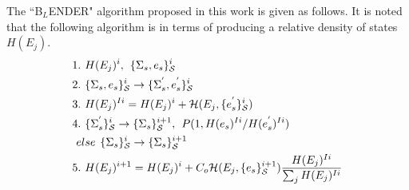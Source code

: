 \documentclass[twocolumn]{article}
\begin{document}
The ``B$_{L}$ENDER" algorithm proposed in this work  is given as follows. It is noted that the following algorithm is in terms of producing a relative density of states $H(E_j)$.  \\
\begin{equation}
\begin{split}
&1.\hspace{0.125cm} H(E_j)^i ,\hspace{0.15cm}  \{\Sigma_{s},e_s\}_{\mathcal{S}}^i\\
&2. \hspace{0.125cm}\{\Sigma_{s},e_s\}_{\mathcal{S}}^i \rightarrow  \{\Sigma_{s}^{'},e_s^{'}\}_{\mathcal{S}}^i\\
&3. \hspace{0.125cm}H(E_j)^{Ii} = H(E_j)^i + \mathcal{H}(E_j, \{e_{s}^{'}\}_{\mathcal{S}}^i) \\
&4. \hspace{0.125cm}\{\Sigma_{s}^{'}\}_{\mathcal{S}}^i \rightarrow \{\Sigma_{s}\}_{\mathcal{S}}^{i+1}, \hspace{0.15cm} P(1, H(e_s)^{Ii}/H(e_s^{'})^{Ii})\\
& \hspace{0.125cm}else  \hspace{0.15cm} \{\Sigma_{s}\}_{\mathcal{S}}^i \rightarrow \{\Sigma_{s}\}_{\mathcal{S}}^{i+1}\\
&5. \hspace{0.125cm} H(E_j)^{i+1} = H(E_j)^{i} + C_o\mathcal{H}(E_j, \{e_s\}_{\mathcal{S}}^{i+1})\frac{H(E_j)^{Ii}}{\sum_j H(E_j)^{Ii} }\\
\end{split}
\end{equation}
\end{document}
